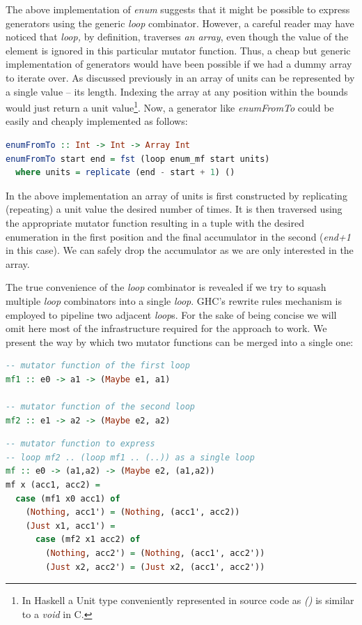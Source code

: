 \documentclass[preamble.tex]{subfiles}
\begin{document}
The above implementation of \emph{enum} suggests that it might be possible to express generators using the generic \emph{loop} combinator. However, a careful reader may have noticed that \emph{loop,} by definition, traverses \emph{an array}, even though the value of the element is ignored in this particular mutator function. Thus, a cheap but generic implementation of generators would have been possible if we had a dummy array to iterate over. As discussed previously in  an array of units can be represented by a single value -- its length. Indexing the array at any position within the bounds would just return a unit value\footnote{In Haskell a Unit type conveniently represented in source code as \emph{()} is similar to a \emph{void} in C.}. Now, a generator like \emph{enumFromTo} could be easily and cheaply implemented as follows:

\begin{lstlisting}[basicstyle={\ttfamily},language=Haskell]
enumFromTo :: Int -> Int -> Array Int
enumFromTo start end = fst (loop enum_mf start units)
  where units = replicate (end - start + 1) ()
\end{lstlisting}


In the above implementation an array of units is first constructed by replicating (repeating) a unit value the desired number of times. It is then traversed using the appropriate mutator function resulting in a tuple with the desired enumeration in the first position and the final accumulator in the second (\emph{end+1} in this case). We can safely drop the accumulator as we are only interested in the array.

The true convenience of the \emph{loop} combinator is revealed if we try to squash multiple \emph{loop} combinators into a single \emph{loop}. GHC's rewrite rules mechanism is employed to pipeline two adjacent \emph{loop}s. For the sake of being concise we will omit here most of the infrastructure required for the approach to work. We present the way by which two mutator functions can be merged into a single one:

\begin{lstlisting}[basicstyle={\ttfamily},language=Haskell]
-- mutator function of the first loop
mf1 :: e0 -> a1 -> (Maybe e1, a1)

-- mutator function of the second loop
mf2 :: e1 -> a2 -> (Maybe e2, a2)
\end{lstlisting}


\begin{lstlisting}[basicstyle={\ttfamily},language=Haskell]
-- mutator function to express
-- loop mf2 .. (loop mf1 .. (..)) as a single loop
mf :: e0 -> (a1,a2) -> (Maybe e2, (a1,a2))
mf x (acc1, acc2) =
  case (mf1 x0 acc1) of
    (Nothing, acc1') = (Nothing, (acc1', acc2))
    (Just x1, acc1') =
      case (mf2 x1 acc2) of
        (Nothing, acc2') = (Nothing, (acc1', acc2'))
        (Just x2, acc2') = (Just x2, (acc1', acc2'))
\end{lstlisting}
\end{document}
